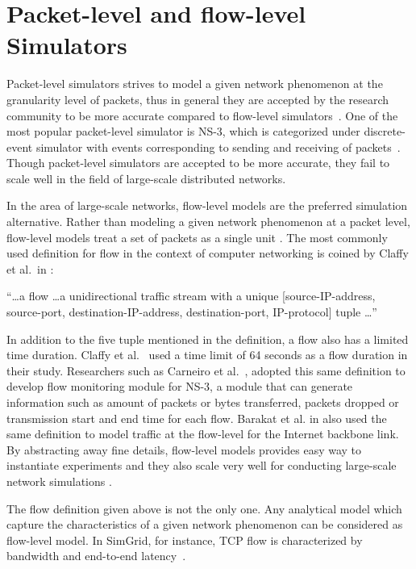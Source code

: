  
\section{Packet-level and flow-level Simulators}
\label{section:packetflow} 
Packet-level simulators strives to model a given network phenomenon at the granularity level of packets, thus in general they are accepted by the research community to be more accurate compared to flow-level simulators~\cite{DBLP:journals/jpdc/CasanovaGLQS14}. One of the most popular packet-level simulator is NS-3, which is categorized under discrete-event simulator with events corresponding to sending and receiving of packets~\cite{ns3}. Though packet-level simulators are accepted to be more accurate, they fail to scale well in the field of large-scale distributed networks. 

In the area of large-scale networks, flow-level models are the preferred simulation alternative. Rather than modeling a given network phenomenon at a packet level, flow-level models treat a set of packets as a single unit \cite{DBLP:journals/jpdc/CasanovaGLQS14}. The most commonly used definition for flow in the context of computer networking is coined by Claffy et al.{\ }in \cite{claffy1998nature}: 

``\ldots a flow \ldots a unidirectional traffic stream with a unique [source-IP-address, source-port, destination-IP-address, destination-port, IP-protocol] tuple \ldots''

In addition to the five tuple mentioned in the definition, a flow also has a limited time duration. Claffy et al.{\ }\cite{claffy1998nature} used a time limit of 64 seconds as a flow duration in their study. Researchers such as Carneiro et al.{\ }\cite{DBLP:conf/valuetools/CarneiroFR09}, adopted this same definition to develop flow monitoring module for NS-3, a module that can generate information such as amount of packets or bytes transferred, packets dropped or transmission start and end time for each flow. Barakat et al. in \cite{DBLP:journals/tsp/BarakatTIDO03} also used the same definition to model traffic at the flow-level for the Internet backbone link. By abstracting away fine details, flow-level models provides easy way to instantiate experiments and they also scale very well for conducting large-scale network simulations \cite{DBLP:journals/jpdc/CasanovaGLQS14,DBLP:journals/tsp/BarakatTIDO03}.

The flow definition given above is not the only one. Any analytical model which capture the characteristics of a given network phenomenon can be considered as flow-level model. In SimGrid, for instance, TCP flow is characterized by bandwidth and end-to-end latency~\cite{DBLP:journals/jpdc/CasanovaGLQS14}.



